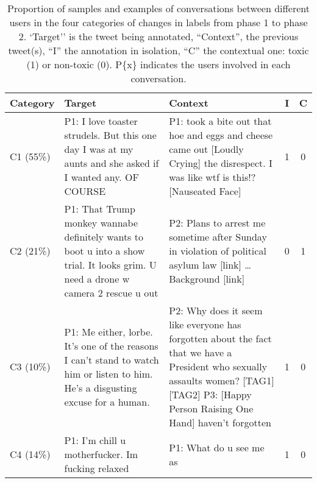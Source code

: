 \documentclass[acmsmall]{acmart}
\begin{document}
\begin{table*}[]
\begin{footnotesize}
\begin{tabular}{l|p{4.5cm}|p{4.5cm}|c|c}
\toprule \textbf{Category} & \textbf{Target} & \textbf{Context} & {\bf I} & {\bf C} \\ \midrule
C1 (55\%) & P1: I love toaster strudels. But this one day I was at my aunts and she asked if I wanted any. OF COURSE & P1: took a bite out that hoe and eggs and cheese came out [Loudly Crying] the disrespect. I was like wtf is this!? [Nauseated Face] & 1 & 0 \\ \hline
C2 (21\%) &  P1: That Trump monkey wannabe definitely wants to boot u into a show trial. It looks grim. U need a drone w camera 2 rescue u out  & P2: Plans to arrest me sometime after Sunday in violation of political asylum law [link] … Background [link] & 0 & 1 \\ \hline
C3 (10\%) & P1: Me either, lorbe. It's one of the reasons I can't stand to watch him or listen to him. He's a disgusting excuse for a human. & P2: Why does it seem like everyone has forgotten about the fact that we have a President who sexually assaults women? [TAG1]  [TAG2] P3: [Happy Person Raising One Hand] haven't forgotten & 1 & 0 \\ \hline
C4 (14\%) & P1: I'm chill u motherfucker. Im fucking relaxed & P1: What do u see me as & 1 & 0 \\
\bottomrule
\end{tabular}
\end{footnotesize}
\caption{\label{font-table} Proportion of samples and examples of conversations between different users in the four categories of changes in labels from phase 1 to phase 2. `Target'' is the tweet being annotated,  ``Context'',  the previous tweet(s), ``I'' the annotation in isolation, ``C'' the contextual one: toxic (1) or non-toxic (0). P\{x\} indicates the users involved in each conversation.}
\end{table*}
\end{document}
